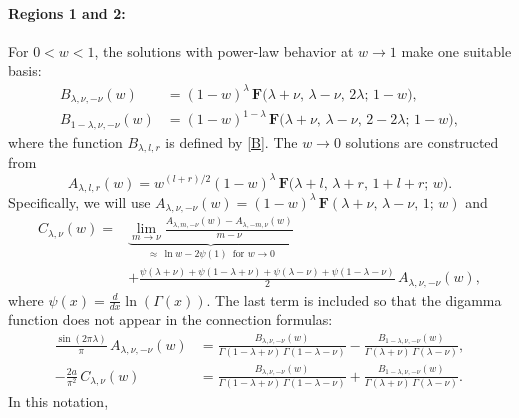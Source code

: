 \documentclass[12pt]{article}
\newcommand{\hgfs}{\mathbf{F}}
\begin{document}
\paragraph{Regions 1 and 2:} For $0<w<1$, the solutions with power-law behavior at $w\to 1$ make one suitable basis:
\begin{equation}
\begin{aligned}
B_{\lambda,\nu,-\nu}(w) &=(1-w)^{\lambda}\,
\hgfs\bigl(\lambda+\nu,\,\lambda-\nu,\,2\lambda;\,1-w\bigr),
\\[2pt]
B_{1-\lambda,\nu,-\nu}(w) &=(1-w)^{1-\lambda}\,
\hgfs\bigl(\lambda+\nu,\,\lambda-\nu,\,2-2\lambda;\,1-w\bigr),
\end{aligned}
\end{equation}
where the function $B_{\lambda,l,r}$ is defined by \eqref{B}. The $w\to 0$ solutions are constructed from
\begin{equation} \label{Af}
A_{\lambda,l,r}(w)=w^{(l+r)/2}(1-w)^{\lambda}\,
\hgfs\bigl(\lambda+l,\,\lambda+r,\,1+l+r;\,w\bigr).
\end{equation}
Specifically, we will use $A_{\lambda,\nu,-\nu}(w) =(1-w)^{\lambda}\, \hgfs(\lambda+\nu,\,\lambda-\nu,\,1;\,w)$ and
\begin{equation}
\begin{aligned} \label{Cf}
C_{\lambda,\nu}(w)={}&
\underbrace{\lim_{m\to\nu}\frac{A_{\lambda,m,-\nu}(w)-A_{\lambda,-m,\nu}(w)}
{m-\nu}}_{\approx\,\ln w-2\psi(1)\, \text{ for } w\to 0}\\[2pt]
&+\frac{\psi(\lambda+\nu)+\psi(1-\lambda+\nu)
+\psi(\lambda-\nu)+\psi(1-\lambda-\nu)}{2}\,A_{\lambda,\nu,-\nu}(w),
\end{aligned}
\end{equation}
where $\psi(x)=\frac{d}{dx}\ln(\Gamma(x))$. The last term is included so that the digamma function does not appear in the connection formulas:
\begin{equation}
\begin{aligned} \label{ABtrans12}
\frac{\sin(2\pi\lambda)}{\pi}\,A_{\lambda,\nu,-\nu}(w)
&=\frac{B_{\lambda,\nu,-\nu}(w)}{\Gamma(1-\lambda+\nu)\,\Gamma(1-\lambda-\nu)}
-\frac{B_{1-\lambda,\nu,-\nu}(w)}{\Gamma(\lambda+\nu)\,\Gamma(\lambda-\nu)},
\\[3pt]
-\frac{2a}{\pi^2}\,C_{\lambda,\nu}(w)
&=\frac{B_{\lambda,\nu,-\nu}(w)}{\Gamma(1-\lambda+\nu)\,\Gamma(1-\lambda-\nu)}
+\frac{B_{1-\lambda,\nu,-\nu}(w)}{\Gamma(\lambda+\nu)\,\Gamma(\lambda-\nu)}.
\end{aligned}
\end{equation}
In this notation,
\end{document}
